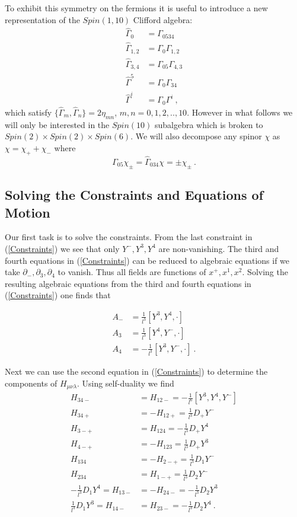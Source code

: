 \documentclass[12pt]{article}
\newcommand{\hG}{{\hat \Gamma}}
\newcommand{\nn}{\nonumber}
\numberwithin{equation}{section}
\begin{document}
To exhibit this symmetry on the fermions it is useful to introduce a new representation of the $Spin(1,10)$ Clifford algebra:
\begin{align}
\hat{\Gamma}_0 &=  \Gamma_{0534}\nn\\
\hat{\Gamma}_{1,2} &= \Gamma_0 \Gamma_{1,2} \nonumber \\
\hat{\Gamma}_{3,4} &= \Gamma_{05} \Gamma_{4,3} \nonumber \\
\hat{\Gamma}^{5} &= \Gamma_0 \Gamma_{34} \nonumber \\
\hat{\Gamma}^i &= \Gamma_0 \Gamma^i \nonumber  \ ,
\end{align}
which satisfy $\{\hG_m,\hG_n\} = 2\eta_{mn}$, $m,n=0,1,2,..,10$.
However in what follows  we will only be interested in the $Spin(10)$ subalgebra which is broken to $Spin(2)\times Spin(2)\times Spin(6)$. We will also decompose any spinor $\chi$ as $\chi = \chi_++\chi_-$ where
\begin{equation}
\Gamma_{05}\chi_\pm  = \hG_{034}\chi=\pm\chi_{\pm} \ .
\end{equation}

\subsection{Solving the Constraints and Equations of Motion}

Our first task is to solve the constraints. From the last constraint in (\ref{Constraints}) we see that only $Y^-,Y^3,Y^4$ are non-vanishing. The third and fourth equations in (\ref{Constraints}) can be reduced to algebraic equations if we take
$\partial_-,\partial_3,\partial_4$ to vanish. Thus all fields are functions of $x^+,x^1,x^2$. Solving the resulting algebraic equations  from the third and fourth equations in (\ref{Constraints}) one finds that

\begin{align}
A_- &= \frac{1}{l^3} \left[ Y^3, Y^4, \cdot \right]\nonumber \\
A_3 &= \frac{1}{l^3} \left[ Y^4, Y^-, \cdot \right]\nonumber \\
A_4 &= -\frac{1}{l^3} \left[ Y^3, Y^-, \cdot \right] \ .
\end{align}

Next we can use the second equation in (\ref{Constraints}) to determine the components of $H_{\mu\nu\lambda}$. Using self-duality we find
\begin{align}
H_{34-}&=H_{12-}= -\frac{1}{l^{6}}\left[Y^{3},Y^{4},Y^{-}\right]\nn\\
H_{34+}&=-H_{12+}=\frac{1}{l^{3}}D_{+}Y^{-}\nn\\
H_{3-+}&=H_{124}=-\frac{1}{l^{3}}D_{+}Y^{4}\nn\\
H_{4-+}&=-H_{123}=\frac{1}{l^{3}}D_{+}Y^{3}\nn\\
H_{134}&=-H_{2-+}=\frac{1}{l^{3}}D_{1}Y^{-}\nn\\
H_{234}&=H_{1-+}=\frac{1}{l^{3}}D_{2}Y^{-}\nn\\
-\frac{1}{l^{3}}D_{1}Y^{4}=H_{13-}&=-H_{24-}=-\frac{1}{l^{3}}D_{2}Y^{3}\nn\\
\frac{1}{l^{3}}D_{1}Y^{3}=H_{14-}&=H_{23-}=-\frac{1}{l^{3}}D_{2}Y^{4}\ .
\end{align}
\end{document}

